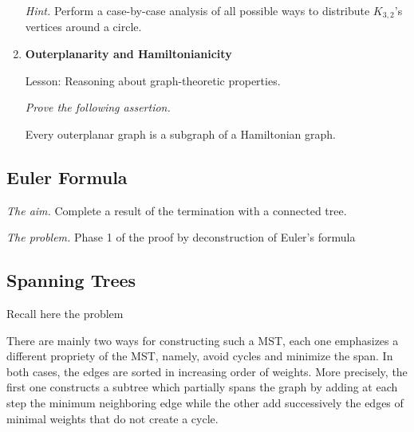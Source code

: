 \begin{enumerate}
\medskip

\noindent \textit{Hint.}
Perform a case-by-case analysis of all possible ways to distribute $K_{3,2}$'s vertices around a circle.

\item
{\bf Outerplanarity and Hamiltonianicity}

{\sc Lesson:} Reasoning about graph-theoretic properties.

\smallskip

{\em Prove the following assertion.}

\begin{prop}
Every outerplanar graph is a subgraph of a Hamiltonian graph.
\end{prop}

\end{enumerate}


\subsection{Euler Formula}

\noindent \textit{The aim.}
Complete a result of the termination with a connected tree.
\medskip

\noindent \textit{The problem.}
Phase 1 of the proof by deconstruction of Euler's formula
\medskip



\subsection{Spanning Trees}
\label{Exercice:spanningTrees}

%
Recall here the problem
\medskip

There are mainly two ways for constructing such a MST, each one
emphasizes a different propriety of the MST, namely, avoid cycles and
minimize the span.  In both cases, the edges are sorted in increasing
order of weights.  More precisely, the first one constructs a subtree
which partially spans the graph by adding at each step the minimum
neighboring edge while the other add successively the edges of minimal
weights that do not create a cycle.


